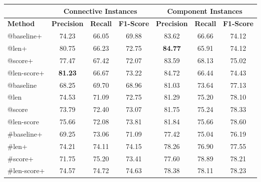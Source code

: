 \begin{table}[ht]
\centering
\begin{tabular}{|l|c|c|c|c|c|c|}
\hline
                            & \multicolumn{3}{|c|}{Connective Instances} & \multicolumn{3}{|c|}{Component Instances} \\ \hline
\bf Method                  & \bf Precision & \bf Recall & \bf F1-Score  & \bf Precision & \bf Recall & \bf F1-Score \\ \hline
    @baseline+              &     74.23     &     66.05  &     69.88     &     83.62     &     66.66  &     74.12    \\ \hline
    @len+                   &     80.75     &     66.23  &     72.75     & \bf 84.77     &     65.91  &     74.12    \\ \hline
    @score+                 &     77.47     &     67.42  &     72.07     &     83.59     &     68.13  &     75.02    \\ \hline
    @len-score+             & \bf 81.23     &     66.67  &     73.22     &     84.72     &     66.44  &     74.43    \\

\hhline{|=|=|=|=|=|=|=|}

    @baseline               &     68.25     &     69.70  &     68.96     &     81.03     &     73.64  &     77.13    \\ \hline
    @len                    &     74.53     &     71.09  &     72.75     &     81.29     &     75.20  &     78.10    \\ \hline
    @score                  &     73.79     &     72.40  &     73.07     &     81.75     &     75.24  &     78.33    \\ \hline
    @len-score              &     75.66     &     72.08  &     73.81     &     81.84     &     75.66  &     78.60    \\

\hhline{|=|=|=|=|=|=|=|}

   \#baseline+              &     69.25     &     73.06  &     71.09     &     77.42     &     75.04  &     76.19    \\ \hline
   \#len+                   &     74.21     &     74.11  &     74.15     &     78.26     &     76.90  &     77.55    \\ \hline
   \#score+                 &     71.75     &     75.20  &     73.41     &     77.60     &     78.89  &     78.21    \\ \hline
   \#len-score+             &     74.57     &     74.72  &     74.63     &     78.38     &     78.11  &     78.23    \\


\end{tabular}
\end{table}
